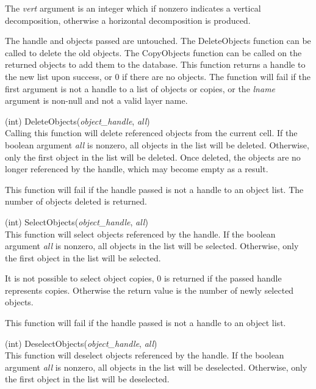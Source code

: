\begin{description}
The {\it vert} argument is an integer which if nonzero indicates a
vertical decomposition, otherwise a horizontal decomposition is
produced.

The handle and objects passed are untouched.  The {\vt DeleteObjects}
function can be called to delete the old objects.  The {\vt
CopyObjects} function can be called on the returned objects to add them
to the database.  This function returns a handle to the new list upon
success, or 0 if there are no objects.  The function will fail if the
first argument is not a handle to a list of objects or copies, or the
{\it lname} argument is non-null and not a valid layer name.

\item{(int) \vt DeleteObjects({\it object\_handle\/}, {\it all\/})}\\
Calling this function will delete referenced objects from the current
cell.  If the boolean argument {\it all} is nonzero, all objects in
the list will be deleted.  Otherwise, only the first object in the
list will be deleted.  Once deleted, the objects are no longer
referenced by the handle, which may become empty as a result.

This function will fail if the handle passed is not a handle to an
object list.  The number of objects deleted is returned.

\item{(int) \vt SelectObjects({\it object\_handle\/}, {\it all\/})}\\
This function will select objects referenced by the handle.  If the
boolean argument {\it all} is nonzero, all objects in the list will be
selected.  Otherwise, only the first object in the list will be
selected.

It is not possible to select object copies, 0 is returned if the
passed handle represents copies.  Otherwise the return value is the
number of newly selected objects.

This function will fail if the handle passed is not a handle to an
object list.

\item{(int) \vt DeselectObjects({\it object\_handle\/}, {\it all\/})}\\
This function will deselect objects referenced by the handle.  If the
boolean argument {\it all} is nonzero, all objects in the list will be
deselected.  Otherwise, only the first object in the list will be
deselected.


\end{description}
